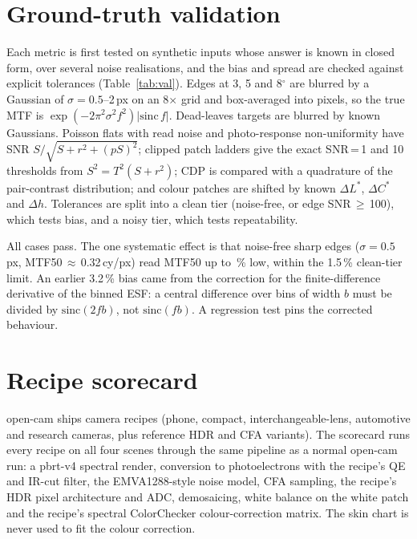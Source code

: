 \documentclass[letterpaper,twocolumn,fleqn]{article}
\begin{document}
\section{Ground-truth validation}
Each metric is first tested on synthetic inputs whose answer is known in closed form, over several noise realisations, and the bias and spread are checked against explicit tolerances (Table~\ref{tab:val}). Edges at 3, 5 and 8$^\circ$ are blurred by a Gaussian of $\sigma=0.5$--2\,px on an 8$\times$ grid and box-averaged into pixels, so the true MTF is $\exp(-2\pi^2\sigma^2f^2)|\mathrm{sinc}\,f|$. Dead-leaves targets are blurred by known Gaussians. Poisson flats with read noise and photo-response non-uniformity have SNR $S/\sqrt{S+r^2+(pS)^2}$; clipped patch ladders give the exact SNR\,=\,1 and 10 thresholds from $S^2 = T^2(S+r^2)$; CDP is compared with a quadrature of the pair-contrast distribution; and colour patches are shifted by known $\Delta L^*$, $\Delta C^*$ and $\Delta h$. Tolerances are split into a clean tier (noise-free, or edge SNR\,$\geq$\,100), which tests bias, and a noisy tier, which tests repeatability.

\begin{table}[t]
\caption{Ground-truth validation: worst case over all configurations against the tolerance (\valCases{} cases, \valFailures{} failures; seed 0, also passing with seeds 1--3).}
\label{tab:val}
\vspace{14pt}
\centering\small

\end{table}

All cases pass. The one systematic effect is that noise-free sharp edges ($\sigma=0.5$\,px, MTF50\,$\approx$\,0.32\,cy/px) read MTF50 up to \valSharpBias\,\% low, within the 1.5\,\% clean-tier limit. An earlier 3.2\,\% bias came from the correction for the finite-difference derivative of the binned ESF: a central difference over bins of width $b$ must be divided by $\mathrm{sinc}(2fb)$, not $\mathrm{sinc}(fb)$. A regression test pins the corrected behaviour.

\section{Recipe scorecard}
open-cam ships \nRecipes{} camera recipes (phone, compact, interchangeable-lens, automotive and research cameras, plus reference HDR and CFA variants). The scorecard runs every recipe on all four scenes through the same pipeline as a normal open-cam run: a pbrt-v4 spectral render, conversion to photoelectrons with the recipe's QE and IR-cut filter, the EMVA1288-style noise model, CFA sampling, the recipe's HDR pixel architecture and ADC, demosaicing, white balance on the white patch and the recipe's spectral ColorChecker colour-correction matrix. The skin chart is never used to fit the colour correction.
\end{document}
